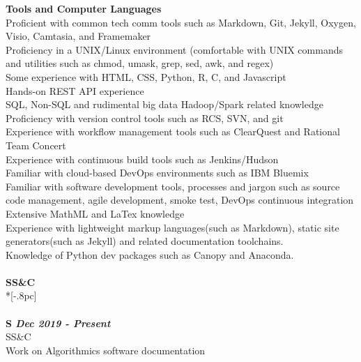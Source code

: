 \documentclass[11pt]{extarticle}
\begin{document}
{\bf Tools and Computer Languages} \\
Proficient with common tech comm tools such as Markdown, Git, Jekyll, Oxygen, Visio, Camtasia, and Framemaker\\
Proficiency in a UNIX/Linux environment (comfortable with UNIX commands and utilities such as chmod, umask, grep, sed, awk, and regex)\\
Some experience with HTML, CSS, Python, R, C, and Javascript \\
Hands-on REST API experience \\
SQL, Non-SQL and rudimental big data Hadoop/Spark related knowledge\\
Proficiency with version control tools such as RCS, SVN, and git\\
Experience with workflow management tools such as ClearQuest and Rational Team Concert \\
Experience with continuous build tools such as Jenkins/Hudson \\
Familiar with cloud-based DevOps environments such as IBM Bluemix  \\
Familiar with software development tools, processes and jargon such as source code management, agile development, smoke test, DevOps continuous integration \\
Extensive MathML and LaTex knowledge\\
Experience with lightweight markup languages(such as Markdown), static site generators(such as Jekyll) and related documentation toolchains.\\
Knowledge of Python dev packages such as Canopy and Anaconda.\\
\\
{\large \bf SS&C }  \\*[-.8pc]
\underline{\hspace{6.55in}} \\
\\
{\bf S \hfill \it Dec 2019 - Present}  \\
SS&C \\
Work on Algorithmics software documentation  
\end{document}
